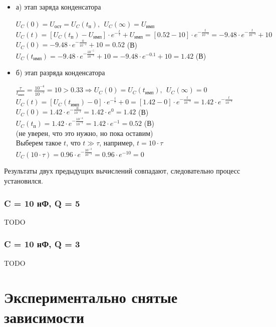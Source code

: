 	\begin{itemize}
\item[] а) этап заряда конденсатора

		$U_C(0) = U_\text{ост} = U_C(t_\text{п}),\ \ U_C(\infty) = U_\text{имп}$\\
		$U_C(t) = [U_C(t_\text{п}) - U_\text{имп}] \cdot e^{-\frac{t}{\tau}} + U_\text{имп} = [0.52 - 10] \cdot e^{-\frac{t}{10^{-4}}} = -9.48 \cdot e^{-\frac{t}{10^{-4}}} + 10$\\
		$U_C(0) = -9.48 \cdot e^{-\frac{0}{10^{-4}}} + 10 = 0.52$ (В)\\
		$U_C(t_\text{имп}) = -9.48 \cdot e^{-\frac{10^{-5}}{10^{-4}}} + 10 = -9.48 \cdot e^{-0.1} + 10 = 1.42$ (В)\\
		
\item[] б) этап разряда конденсатора
	
		$\frac{\tau}{t_\text{имп}} = \frac{10^{-4}}{10^{-5}} = 10 > 0.33 \Rightarrow U_C(0) = U_C(t_\text{имп}),\ \ U_C(\infty) = 0$\\
		$U_C(t) = [U_C(t_\text{имп}) - 0] \cdot e^{-\frac{t}{\tau}} + 0 =  [1.42 - 0] \cdot e^{-\frac{t}{10^{-4}}} = 1.42 \cdot e^{-\frac{t}{10^{-4}}}$\\
		$U_C(0) = 1.42 \cdot e^{-\frac{0}{10^{-4}}} = 1.42 \cdot e^0 = 1.42$ (В)\\
		$U_C(t_\text{п}) = 1.42 \cdot e^{-\frac{10^{-4}}{10^{-4}}} = 1.42 \cdot e^{-1} = 0.52$ (В)\\
		(не уверен, что это нужно, но пока оставим)\\
		Выберем такое $t$, что $t \gg \tau$, например, $t = 10 \cdot \tau$ \\
		$U_C( 10 \cdot \tau) = 0.96 \cdot e^{-\frac{10^{-3}}{10^{-4}}} = 0.96 \cdot e^{-10} = 0$	
		
\end{itemize}

	Результаты двух предыдущих вычислений совпадают, следовательно процесс установился.

\subsubsection{C = 10 нФ, Q = 5}
TODO

\subsubsection{C = 10 нФ, Q = 3}
TODO

\section{Экспериментально снятые зависимости}

